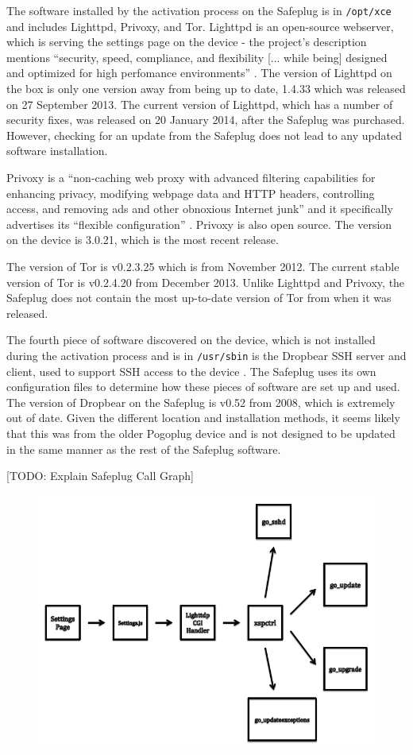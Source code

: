 \documentclass[conference]{IEEEtran}
\begin{document}
The software installed by the activation process on the Safeplug is in \verb!/opt/xce! and includes Lighttpd, Privoxy, and Tor.  Lighttpd is an open-source webserver, which is serving the settings page on the device - the project's description mentions ``security, speed, compliance, and flexibility [... while being] designed and optimized for high perfomance environments'' \cite{lighttpd}.  The version of Lighttpd on the box is only one version away from being up to date, 1.4.33 which was released on 27 September 2013.  The current version of Lighttpd, which has a number of security fixes, was released on 20 January 2014, after the Safeplug was purchased.  However, checking for an update from the Safeplug does not lead to any updated software installation.

Privoxy is a ``non-caching web proxy with advanced filtering capabilities for enhancing privacy, modifying webpage data and HTTP headers, controlling access, and removing ads and other obnoxious Internet junk'' and it specifically advertises its ``flexible configuration'' \cite{privoxy}.  Privoxy is also open source.  The version on the device is 3.0.21, which is the most recent release.

The version of Tor is v0.2.3.25 which is from November 2012.  The current stable version of Tor is v0.2.4.20 from December 2013.  Unlike Lighttpd and Privoxy, the Safeplug does not contain the most up-to-date version of Tor from when it was released.

The fourth piece of software discovered on the device, which is not installed during the activation process and is in \verb!/usr/sbin! is the Dropbear SSH server and client, used to support SSH access to the device \cite{dropbear}.  The Safeplug uses its own configuration files to determine how these pieces of software are set up and used.  The version of Dropbear on the Safeplug is v0.52 from 2008, which is extremely out of date.  Given the different location and installation methods, it seems likely that this was from the older Pogoplug device and is not designed to be updated in the same manner as the rest of the Safeplug software.

[TODO: Explain Safeplug Call Graph]
\begin{figure}
\centering
\includegraphics[width=.75\textwidth]{callgraph}
\caption{}
\label{fig:callgraph}
\end{figure} 
\end{document}

